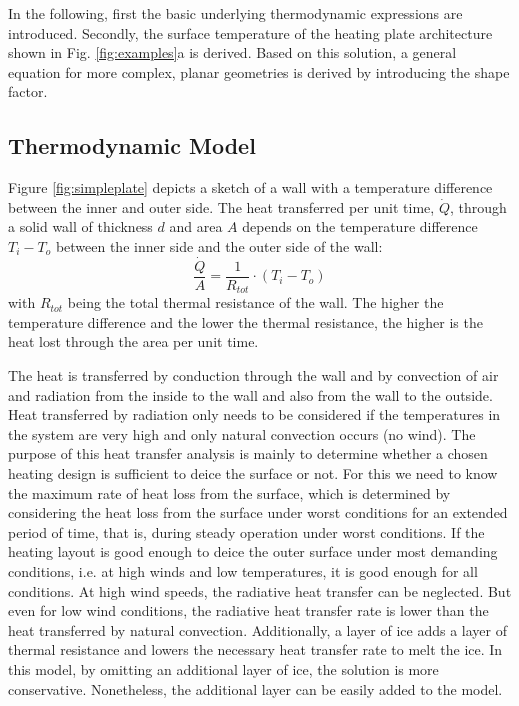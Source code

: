 In the following, first the basic underlying thermodynamic expressions are introduced. Secondly, the surface temperature of the heating plate architecture shown in Fig. \ref{fig:examples}a is derived. Based on this solution, a general equation for more complex, planar geometries is derived by introducing the shape factor.

\subsection{Thermodynamic Model}\label{chapter:basics}
Figure \ref{fig:simpleplate} depicts a sketch of a wall with a temperature difference between the inner and outer side. The heat transferred per unit time, \(\dot Q\), through a solid wall of thickness \(d\) and area \(A\) depends on the temperature difference \(T_i - T_o\) between the inner side and the outer side of the wall:
\begin{equation}
\frac{\dot Q}{A} =  \frac{1}{R_{tot}}\cdot (T_i - T_o)
\end{equation}
with \(R_{tot}\) being the total thermal resistance of the wall. The higher the temperature difference and the lower the thermal resistance, the higher is the heat lost through the area per unit time. 

The heat is transferred by conduction through the wall and by convection of air and radiation from the inside to the wall and also from the wall to the outside. Heat transferred by radiation only needs to be considered if the temperatures in the system are very high and only natural convection occurs (no wind). The purpose of this heat transfer analysis is mainly to determine whether a chosen heating design is sufficient to deice the surface or not. For this we need to know the maximum rate of heat loss from the surface, which is determined by considering the heat loss from the surface under worst conditions for an extended period of time, that is, during steady operation under worst conditions. If the heating layout is good enough to deice the outer surface under most demanding conditions, i.e. at high winds and low temperatures, it is good enough for all conditions. At high wind speeds, the radiative heat transfer can be neglected. But even for low wind conditions, the radiative heat transfer rate is lower than the heat transferred by natural convection. Additionally, a layer of ice adds a layer of thermal resistance and lowers the necessary heat transfer rate to melt the ice. In this model, by omitting an additional layer of ice, the solution is more conservative. Nonetheless, the additional layer can be easily added to the model.

